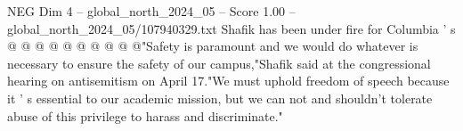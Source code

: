 \begin{textsample}{NEG Dim 4 – global\_north\_2024\_05 – Score 1.00 – global\_north\_2024\_05/107940329.txt}
Shafik has been under fire for Columbia ' s @ @ @ @ @ @ @ @ @ @"Safety is paramount and we would do whatever is necessary to ensure the safety of our campus,"Shafik said at the congressional hearing on antisemitism on April 17."We must uphold freedom of speech because it ' s essential to our academic mission, but we can not and shouldn't tolerate abuse of this privilege to harass and discriminate."

\end{textsample}
